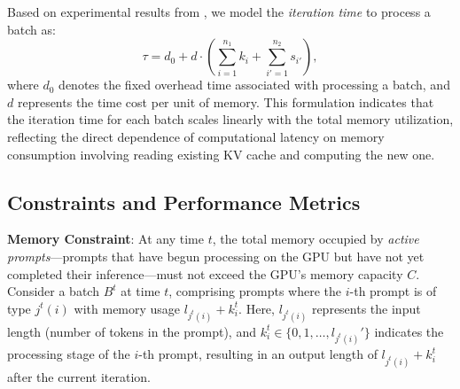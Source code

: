 Based on experimental results from \cite{agrawal2023sarathi,kwon2023efficient,zhong2024distserve}, we model the \textit{iteration time} to process a batch as:
\begin{equation}
\label{eq:time_consump}
    \tau = d_0 + d \cdot \left( \sum_{i=1}^{n_1} k_i + \sum_{i'=1}^{n_2} s_{i'} \right),
\end{equation}
where \( d_0 \) denotes the fixed overhead time associated with processing a batch, and \( d \) represents the time cost per unit of memory. This formulation indicates that the iteration time for each batch scales linearly with the total memory utilization, reflecting the direct dependence of computational latency on memory consumption involving reading existing KV cache and computing the new one.



\subsection{Constraints and Performance Metrics}

\textbf{Memory Constraint}: At any time \( t \), the total memory occupied by \textit{active prompts}---prompts that have begun processing on the GPU but have not yet completed their inference---must not exceed the GPU's memory capacity \( C \). Consider a batch \( B^t \) at time \( t \), comprising prompts where the \( i \)-th prompt is of type \( j^t(i) \) with memory usage \( l_{j^t(i)} + k_i^t \). Here, \( l_{j^t(i)} \) represents the input length (number of tokens in the prompt), and \( k_i^t \in \{0, 1, \dots, l_{j^t(i)}'\} \) indicates the processing stage of the \( i \)-th prompt, resulting in an output length of \( l_{j^t(i)} + k_i^t \) after the current iteration.

